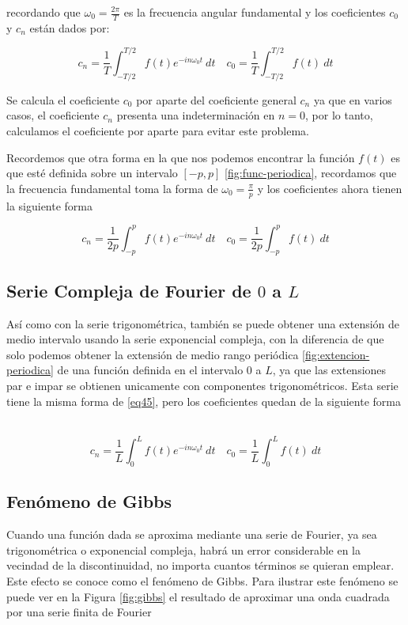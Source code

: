 recordando que $\omega_0 = \frac{2\pi}{T}$ es la frecuencia angular fundamental y los coeficientes $c_0$ y $c_n$ están dados por: 

\begin{equation}\label{eq43}
	c_n = \frac{1}{T} \int_{-T/2}^{T/2} f(t) e^{-i n \omega_0 t} \ dt \quad c_0 = \frac{1}{T} \int_{-T/2}^{T/2} f(t)\ dt 
\end{equation}

Se calcula el coeficiente $c_0$ por aparte del coeficiente general $c_n$ ya que en varios casos, el coeficiente $c_n$ presenta una indeterminación en $n=0$, por lo tanto, calculamos el coeficiente por aparte para evitar este problema.\newline

Recordemos que otra forma en la que nos podemos encontrar la función $f(t)$ es que esté definida sobre un intervalo $[-p, p]$ \ref{fig:func-periodica}, recordamos que la frecuencia fundamental toma la forma de $\omega_0 = \frac{\pi}{p}$ y los coeficientes ahora tienen la siguiente forma

\begin{equation}\label{eq44}
	c_n = \frac{1}{2p} \int_{-p}^{p} f(t) e^{-i n \omega_0 t} \ dt \quad c_0 = \frac{1}{2p} \int_{-p}^{p} f(t)\ dt 
\end{equation}

\subsection{Serie Compleja de Fourier de $0$ a $L$}
Así como con la serie trigonométrica, también se puede obtener una extensión de medio intervalo usando la serie exponencial compleja, con la diferencia de que solo podemos obtener la extensión de medio rango periódica \ref{fig:extencion-periodica} de una función definida en el intervalo $0$ a $L$, ya que las extensiones par e impar se obtienen unicamente con componentes trigonométricos. Esta serie tiene la misma forma de \eqref{eq45}, pero los coeficientes quedan de la siguiente forma ~\cite{fourierCinvestav}

\begin{equation}\label{eq46}
	c_n = \frac{1}{L} \int_{0}^{L} f(t) e^{-i n \omega_0 t} \ dt \quad c_0 = \frac{1}{L} \int_{0}^{L} f(t)\ dt 
\end{equation}

\subsection{Fenómeno de Gibbs}
Cuando una función dada se aproxima mediante una serie de Fourier, ya sea trigonométrica o exponencial compleja, habrá un error considerable en la vecindad de la discontinuidad, no importa cuantos términos se quieran emplear. Este efecto se conoce como el fenómeno de Gibbs. Para ilustrar este fenómeno se puede ver en la Figura \ref{fig:gibbs} el resultado de aproximar una onda cuadrada por una serie finita de Fourier ~\cite{fourierCarrillo}

